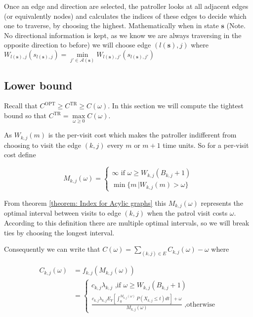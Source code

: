 \documentclass[a4paper,10pt]{article}
\theoremstyle{definition}
\theoremstyle{definition}
\theoremstyle{remark}
\theoremstyle{definition}
\begin{document}
Once an edge and direction are selected, the patroller looks at all adjacent edges (or equivalently nodes) and calculates the indices of these edges to decide which one to traverse, by choosing the highest. Mathematically when in state $\bm{s}$ (Note. No directional information is kept, as we know we are always traversing in the opposite direction to before) we will choose edge $(l(\bm{s}),j)$ where $W_{l(\bm{s}),j}(s_{l(\bm{s}),j})=\min\limits_{j' \in \mathcal{A}(\bm{s})} W_{l(\bm{s}),j'}(s_{l(\bm{s}),j'})$

\subsection{Lower bound}
Recall that $C^{\text{OPT}} \geq C^{\text{TR}} \geq C(\omega)$. In this section we will compute the tightest bound so that $C^{\text{TR}}=\max\limits_{\omega
\geq 0} C(\omega)$.

As $W_{k,j}(m)$ is the per-visit cost which makes the patroller indifferent from choosing to visit the edge $(k,j)$ every $m$ or $m+1$ time units. So for a per-visit cost define

\begin{equation}
M_{k,j}(\omega)= \begin{cases}
\infty \text{ if } \omega \geq W_{k,j}(B_{k,j}+1) \\
\min \{m \, | W_{k,j}(m) > \omega  \}
\end{cases}
\end{equation}

From theorem \ref{theorem: Index for Acylic graphs} this $M_{k,j}(\omega)$ represents the optimal interval between visits to edge $(k,j)$ when the patrol visit costs $\omega$. According to this definition there are multiple optimal intervals, so we will break ties by choosing the longest interval.

Consequently we can write that $C(\omega)=\sum\limits_{(k,j) \in E} C_{k,j}(\omega) - \omega$ where

\begin{align*}
C_{k,j}(\omega)&=f_{k,j}(M_{k,j}(\omega)) \\
& =\begin{cases}
c_{k,j} \lambda_{k,j} \text{ ,if } \omega \geq W_{k,j}(B_{k,j}+1) \\
\frac{c_{k,j} \lambda_{k,j} E_{Y} \left[ \int_{0}^{M_{k,j}(\omega)} P(X_{k,j} \leq t ) dt \right] + \omega}{M_{k,j}(\omega)} \text{ ,otherwise}
\end{cases}
\end{align*}
\end{document}
